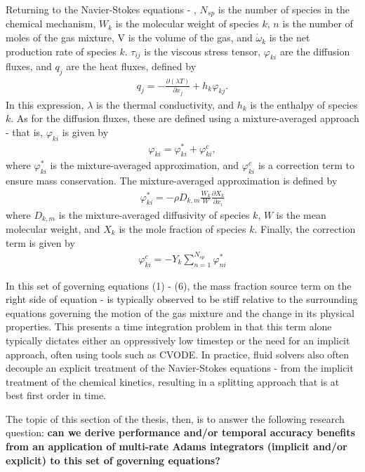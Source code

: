 Returning to the Navier-Stokes equations  - , $N_{sp}$ is the number of species
in the chemical mechanism, $W_{k}$ is the molecular weight of species $k$, $n$ is the number of moles of the gas
mixture, V is the volume of the gas, and $\dot{\omega}_{k}$ is the net production rate of species $k$. $\tau_{ij}$
is the viscous stress tensor, $\varphi_{ki}$ are the diffusion fluxes, and $q_{j}$ are the heat fluxes, defined by
\begin{align}
q_{j} = - \frac{\partial (\lambda T)}{\partial x_{j}} + h_{k}\varphi_{kj}.
\end{align}
In this expression, $\lambda$ is the thermal conductivity, and $h_{k}$ is the enthalpy of species $k$.
As for the diffusion fluxes, these are defined using a mixture-averaged approach - that is, $\varphi_{ki}$
is given by
\begin{align}
\varphi_{ki} = \varphi_{ki}^{*} + \varphi_{ki}^{c},
\end{align}
where $\varphi_{ki}^{*}$ is the mixture-averaged approximation, and $\varphi_{ki}^{c}$
is a correction term to ensure mass conservation. The mixture-averaged approximation
is defined by
\begin{align}
\varphi_{ki}^{*} = -\rho D_{k,m}\frac{W_{k}}{W} \frac{\partial X_{k}}{\partial x_{i}}
\end{align}
where $D_{k,m}$ is the mixture-averaged diffusivity of species $k$, $W$ is the mean
molecular weight, and $X_{k}$ is the mole fraction of species $k$. Finally, the
correction term is given by
\begin{align}
\varphi_{ki}^{c} = -Y_{k} \sum_{n=1}^{N_{sp}} \varphi_{ni}^{*}
\end{align}

In this set of governing equations (1) - (6), the mass fraction source term
on the right side of equation  -  is typically observed
to be stiff relative to the surrounding equations governing the motion of the gas mixture
and the change in its physical properties. This presents a time integration problem in
that this term alone typically dictates either an oppressively low timestep or the need for
an implicit approach, often using tools such as CVODE. In practice, fluid solvers
also often decouple an explicit treatment of the Navier-Stokes equations  - 
from the implicit treatment of the chemical kinetics, resulting in a splitting
approach that is at best first order in time.

The topic of this section of the thesis, then, is to answer the following
research question: \textbf{can we derive performance and/or temporal accuracy benefits
from an application of multi-rate Adams integrators (implicit and/or explicit) to this
set of governing equations?}


